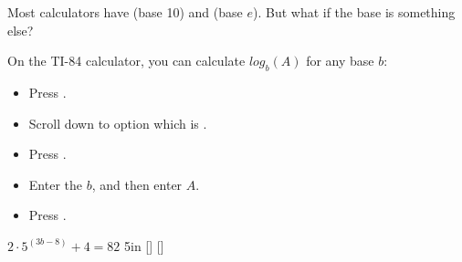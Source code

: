 Most calculators have  (base 10) and  (base $e$). 
But what if the base is something else?

\begin{tcolorbox}[center,colback=white,width=5in,]
    \small
    On the {\scshape TI-84} calculator, you can calculate $log_b(A)$ 
    for any base $b$:
    \begin{itemize}[nosep]
        \item Press .
        \item Scroll down to option  which is .
        \item Press .
        \item Enter the $b$, and then enter $A$.
        \item Press .
    \end{itemize}
\end{tcolorbox}

{
    $2\cdot 5^{(3b-8)} + 4 = 82$
}
{5in}
[]
[]


